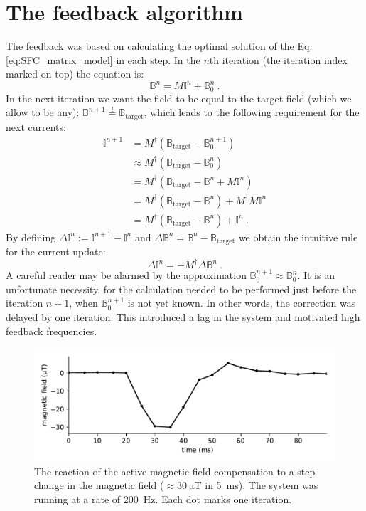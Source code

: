 \section{The feedback algorithm}
The feedback was based on calculating the optimal solution of the Eq.\,\ref{eq:SFC_matrix_model} in each step. In the $n$th iteration (the iteration index marked on top) the equation is:
\begin{equation}
  \mathbb{B}^n = M \mathbb{I}^n + \mathbb{B}_0^n \ .
\end{equation}
In the next iteration we want the field to be equal to the target field (which we allow to be any): $\mathbb{B}^{n+1} \overset{!}{=} \mathbb{B}_\text{target}$, which leads to the following requirement for the next currents:
\begin{align}
  \mathbb{I}^{n+1} &=
    M^\dagger \left( \mathbb{B}_\text{target} - \mathbb{B}_0^{n+1} \right) \nonumber \\
    &\approx M^\dagger \left( \mathbb{B}_\text{target} - \mathbb{B}_0^{n} \right) \nonumber \\
    &= M^\dagger \left( \mathbb{B}_\text{target} - \mathbb{B}^n + M \mathbb{I}^n \right) \nonumber \\
    &= M^\dagger \left( \mathbb{B}_\text{target} - \mathbb{B}^n \right) + M^\dagger M \mathbb{I}^n \nonumber \\
    &= M^\dagger \left( \mathbb{B}_\text{target} - \mathbb{B}^n \right) + \mathbb{I}^n \ . \label{eq:current_update}
\end{align}
By defining $\Delta\mathbb{I}^n := \mathbb{I}^{n+1} - \mathbb{I}^{n}$ and $\Delta\mathbb{B}^n = \mathbb{B}^n - \mathbb{B}_\text{target}$ we obtain the intuitive rule for the current update:
\begin{equation}
  \Delta\mathbb{I}^n = - M^\dagger \Delta\mathbb{B}^n \ .
\end{equation}
A careful reader may be alarmed by the approximation $\mathbb{B}_0^{n+1} \approx \mathbb{B}_0^{n}$. It is an unfortunate necessity, for the calculation needed to be performed just before the iteration $n+1$, when $\mathbb{B}_0^{n+1}$ is not yet known. In other words, the correction was delayed by one iteration. This introduced a lag in the system and motivated high feedback frequencies.

\begin{figure}
  \centering
  \includegraphics[width=.9\linewidth]{gfx/prototype/SFC_step_response.pdf}
  \caption{The reaction of the active magnetic field compensation to a step change in the magnetic field ($\approx \SI{30}{\micro\tesla}$ in \SI{5}{\milli\second}). The system was running at a rate of \SI{200}{\hertz}. Each dot marks one iteration.}\label{fig:prototype_step_response}
\end{figure}

